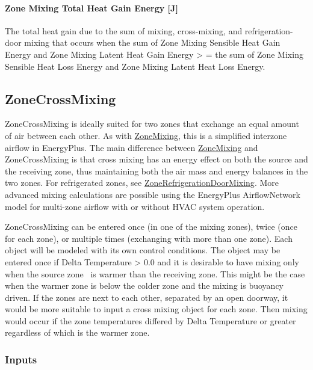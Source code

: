 \paragraph{Zone Mixing Total Heat Gain Energy {[}J{]}}\label{zone-mixing-total-heat-gain-energy-j}

The total heat gain due to the sum of mixing, cross-mixing, and refrigeration-door mixing that occurs when the sum of Zone Mixing Sensible Heat Gain Energy and Zone Mixing Latent Heat Gain Energy \textgreater{} = the sum of Zone Mixing Sensible Heat Loss Energy and Zone Mixing Latent Heat Loss Energy.

\subsection{ZoneCrossMixing}\label{zonecrossmixing}

ZoneCrossMixing is ideally suited for two zones that exchange an equal amount of air between each other. As with \hyperref[zonemixing]{ZoneMixing}, this is a simplified interzone airflow in EnergyPlus. The main difference between \hyperref[zonemixing]{ZoneMixing} and ZoneCrossMixing is that cross mixing has an energy effect on both the source and the receiving zone, thus maintaining both the air mass and energy balances in the two zones. For refrigerated zones, see \hyperref[zonerefrigerationdoormixing]{ZoneRefrigerationDoorMixing}. More advanced mixing calculations are possible using the EnergyPlus AirflowNetwork model for multi-zone airflow with or without HVAC system operation.

ZoneCrossMixing can be entered once (in one of the mixing zones), twice (once for each zone), or multiple times (exchanging with more than one zone). Each object will be modeled with its own control conditions. The object may be entered once if Delta Temperature \textgreater{} 0.0 and it is desirable to have mixing only when the source zone~ is warmer than the receiving zone. This might be the case when the warmer zone is below the colder zone and the mixing is buoyancy driven. If the zones are next to each other, separated by an open doorway, it would be more suitable to input a cross mixing object for each zone. Then mixing would occur if the zone temperatures differed by Delta Temperature or greater regardless of which is the warmer zone.

\subsubsection{Inputs}\label{inputs-6-003}

